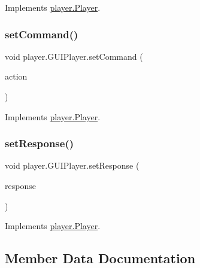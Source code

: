 Implements \mbox{\hyperlink{interfaceplayer_1_1_player_a1e537587aa2b804f6f27f7fd8af18a53}{player.\+Player}}.

\mbox{\label{classplayer_1_1_g_u_i_player_a1e0814130235ac601f2817932e1fd195}} 
\subsubsection{\texorpdfstring{set\+Command()}{setCommand()}}
{\footnotesize\ttfamily void player.\+G\+U\+I\+Player.\+set\+Command (\begin{DoxyParamCaption}\item[{\mbox{\hyperlink{classui_1_1_u_i_action}{U\+I\+Action}}}]{action }\end{DoxyParamCaption})\hspace{0.3cm}{\ttfamily [inline]}}



Implements \mbox{\hyperlink{interfaceplayer_1_1_player_a76a4425b3d1908982f07b75c4a054501}{player.\+Player}}.

\mbox{\label{classplayer_1_1_g_u_i_player_aaaa7d3f93324b2bef898fa2b6c3da8bd}} 
\subsubsection{\texorpdfstring{set\+Response()}{setResponse()}}
{\footnotesize\ttfamily void player.\+G\+U\+I\+Player.\+set\+Response (\begin{DoxyParamCaption}\item[{\mbox{\hyperlink{classui_1_1_game_response}{Game\+Response}}}]{response }\end{DoxyParamCaption})\hspace{0.3cm}{\ttfamily [inline]}}



Implements \mbox{\hyperlink{interfaceplayer_1_1_player_af07ff250619f6dabf201ee2e2f488a4f}{player.\+Player}}.



\subsection{Member Data Documentation}
\mbox{\label{classplayer_1_1_g_u_i_player_a1e0e2afb6ae8a00fd7230253267020ee}} 
